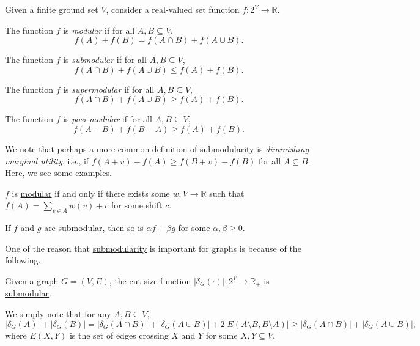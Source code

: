 \begin{definition*}
	Given a finite ground set \(V\), consider a real-valued set function \(f \colon 2^V \to \mathbb{R} \).
	\begin{definition}[Modular]\label{def:modular}
		The function \(f\) is \emph{modular} if for all \(A, B \subseteq V\),
		\[
			f(A) + f(B)
			= f(A \cap B) + f(A \cup B).
		\]
	\end{definition}
	\begin{definition}[Submodular]\label{def:submodular}
		The function \(f\) is \emph{submodular} if for all \(A, B \subseteq V\),
		\[
			f(A \cap B) + f(A \cup B)
			\leq f(A) + f(B).
		\]
	\end{definition}
	\begin{definition}[Supermodular]\label{def:supermodular}
		The function \(f\) is \emph{supermodular} if for all \(A, B \subseteq V\),
		\[
			f(A \cap B) + f(A \cup B)
			\geq f(A) + f(B).
		\]
	\end{definition}
	\begin{definition}\label{def:posi-modular}
		The function \(f\) is \emph{posi-modular} if for all \(A, B \subseteq V\),
		\[
			f(A - B) + f(B - A)
			\geq f(A) + f(B).
		\]
	\end{definition}
\end{definition*}

We note that perhaps a more common definition of \hyperref[def:submodular]{submodularity} is \emph{diminishing marginal utility}, i.e., if \(f(A + v) - f(A) \geq f(B + v) - f(B)\) for all \(A \subseteq B\). Here, we see some examples.

\begin{eg}
	\(f\) is \hyperref[def:modular]{modular} if and only if there exists some \(w\colon V \to \mathbb{R} \) such that \(f(A) = \sum_{v \in A} w(v) + c\) for some shift \(c\).
\end{eg}

\begin{eg}
	If \(f\) and \(g\) are \hyperref[def:submodular]{submodular}, then so is \(\alpha f + \beta g\) for some \(\alpha , \beta \geq 0\).
\end{eg}

One of the reason that \hyperref[def:submodular]{submodularity} is important for graphs is because of the following.

\begin{eg}[Cut]
	Given a graph \(G = (V, E)\), the cut size function \(\lvert \delta _G (\cdot) \rvert \colon 2^V \to \mathbb{R} _+\) is \hyperref[def:submodular]{submodular}.
\end{eg}
\begin{explanation}
	We simply note that for any \(A, B \subseteq V\),
	\[
		\lvert \delta _G (A) \rvert + \lvert \delta _G (B) \rvert
		= \lvert \delta _G (A \cap B) \rvert + \lvert \delta _G (A \cup B) \rvert + 2 \lvert E(A\setminus B, B\setminus A) \rvert
		\geq \lvert \delta _G (A \cap B) \rvert + \lvert \delta _G (A \cup B) \rvert ,
	\]
	where \(E(X, Y)\) is the set of edges crossing \(X\) and \(Y\) for some \(X, Y \subseteq V\).
\end{explanation}

